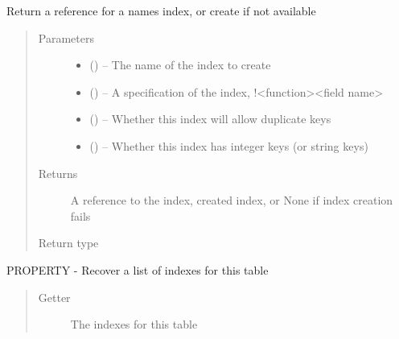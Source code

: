 \documentclass[letterpaper,10pt,english]{sphinxmanual}
\begin{document}
\begin{fulllineitems}
\begin{fulllineitems}
\end{fulllineitems}


\begin{fulllineitems}
\label{\detokenize{index:mamba.Table.index}}
Return a reference for a names index, or create if not available
\begin{quote}\begin{description}
\item[{Parameters}] \leavevmode\begin{itemize}
\item {} 
 () -- The name of the index to create

\item {} 
 () -- A specification of the index, !\textless{}function\textgreater{}\textbar{}\textless{}field name\textgreater{}

\item {} 
 () -- Whether this index will allow duplicate keys

\item {} 
 () -- Whether this index has integer keys (or string keys)

\end{itemize}

\item[{Returns}] \leavevmode
A reference to the index, created index, or None if index creation fails

\item[{Return type}] \leavevmode
{\hyperref[\detokenize{index:mamba.Index}]{}}

\end{description}\end{quote}

\end{fulllineitems}


\begin{fulllineitems}
\label{\detokenize{index:mamba.Table.indexes}}
PROPERTY - Recover a list of indexes for this table
\begin{quote}\begin{description}
\item[{Getter}] \leavevmode
The indexes for this table


\end{description}
\end{quote}
\end{fulllineitems}
\end{fulllineitems}
\end{document}
